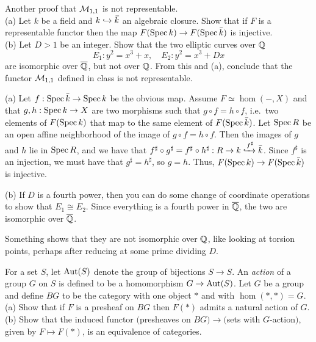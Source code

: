\begin{exercise}[1.5]
  Another proof that $\mathcal{M}_{1,1}$ is not representable.\\
  (a) Let $k$ be a field and $k\hookrightarrow \bbar k$ an algebraic closure. Show that
  if $F$ is a representable functor then the map $F(\operatorname{Spec} k)\to F(\operatorname{Spec} \bar k)$ is
  injective.\\
  (b) Let $D> 1$ be an integer. Show that the two elliptic curves over $\mathbb{Q}$
  \[
     E_1: y^2=x^3+x,\quad E_2:y^2=x^3+Dx
  \]
  are isomorphic over $\overline {\mathbb{Q}}$, but not over $\mathbb{Q}$. From this and (a), conclude that
  the functor $\mathcal{M}_{1,1}$ defined in class is not representable.
\end{exercise}
\begin{solution}
  (a) Let $f:\operatorname{Spec} \bar k\to \operatorname{Spec} k$ be the obvious map. Assume $F\simeq \hom(-,X)$ and
  that $g,h:\operatorname{Spec} k\to X$ are two morphisms such that $g\circ f=h\circ f$, i.e.~two
  elements of $F(\operatorname{Spec} k)$ that map to the same element of $F(\operatorname{Spec} \bar k)$. Let $\operatorname{Spec}
  R$ be an open affine neighborhood of the image of $g\circ f=h\circ f$. Then the images
  of $g$ and $h$ lie in $\operatorname{Spec} R$, and we have that $f^\sharp\circ g^\sharp =
  f^\sharp\circ h^\sharp:R\to k\xhookrightarrow{f^\sharp}\bar k$. Since $f^\sharp$ is an
  injection, we must have that $g^\sharp=h^\sharp$, so $g=h$. Thus, $F(\operatorname{Spec} k)\to
  F(\operatorname{Spec} \bar k)$ is injective.

  (b) If $D$ is a fourth power, then you can do some change of coordinate operations to show
  that $E_1\cong E_2$. Since everything is a fourth power in $\overline {\mathbb{Q}}$, the two are
  isomorphic over $\overline {\mathbb{Q}}$.

  Something shows that they are not isomorphic over $\mathbb{Q}$, like looking at torsion points,
  perhaps after reducing at some prime dividing $D$.
\end{solution}


\begin{exercise}[2.1]
  For a set $S$, let $\operatorname{Aut}(S)$ denote the group of bijections $S\to S$. An \emph{action}
  of a group $G$ on $S$ is defined to be a homomorphism $G\to \operatorname{Aut}(S)$. Let $G$ be a
  group and define $BG$ to be the category with one object $*$ and with
  $\hom(*,*)=G$.\\
  (a) Show that if $F$ is a presheaf on $BG$ then $F(*)$ admits a natural action of $G$.\\
  (b) Show that the induced functor $($presheaves on $BG)\to ($sets with $G$-action$)$,
  given by $F\mapsto F(\ast)$, is an equivalence of categories.
\end{exercise}

